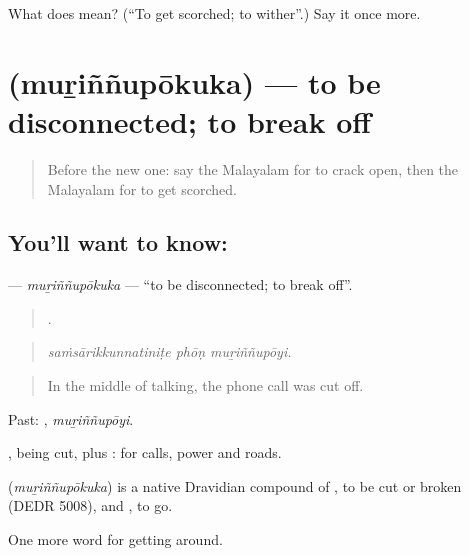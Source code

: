 \begin{tcolorbox}[breakable,colback=teal!4,colframe=teal!35!black,title={Before you move on}]
What does  mean? (\textquotedblleft{}To get scorched; to wither\textquotedblright{}.) Say it once more.
\end{tcolorbox}
\section[\texorpdfstring{\ml{മുറിഞ്ഞുപോകുക} (muṟiññupōkuka)}{മുറിഞ്ഞുപോകുക (muṟiññupōkuka)}]{ (muṟiññupōkuka) — to be disconnected; to break off}

\label{lesson:ML-C514-murinnupokuka}



\begin{quote}
Before the new one: say the Malayalam for to crack open, then the Malayalam for to get scorched.
\end{quote}

\subsection*{You'll want to know: }
\textbf{} — \emph{muṟiññupōkuka} — \textquotedblleft{}to be disconnected; to break off\textquotedblright{}.

\begin{quote}
  .
\end{quote}

\begin{quote}
\emph{saṁsārikkunnatiniṭe phōṇ muṟiññupōyi.}
\end{quote}

\begin{quote}
In the middle of talking, the phone call was cut off.
\end{quote}

Past: , \emph{muṟiññupōyi}.

, being cut, plus : for calls, power and roads.

\begin{cousinweb}
\textbf{} (\emph{muṟiññupōkuka}) is a native Dravidian compound of , to be cut or broken (DEDR 5008), and , to go.
\end{cousinweb}

\begin{grammarlens}[title={What you've built}]
One more word for getting around.
\end{grammarlens}


